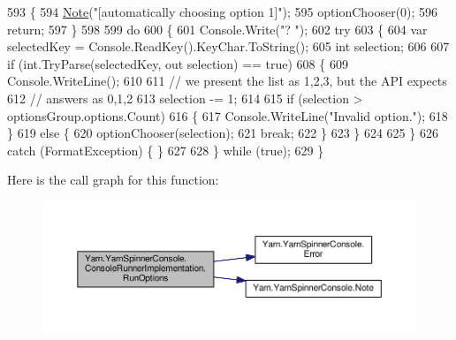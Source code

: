 \begin{DoxyCode}
593                 \{
594                     \hyperlink{a00185_a939cc9e943c574b36c6af93e9c772702}{Note}(\textcolor{stringliteral}{"[automatically choosing option 1]"});
595                     optionChooser(0);
596                     \textcolor{keywordflow}{return};
597                 \}
598 
599                 \textcolor{keywordflow}{do}
600                 \{
601                     Console.Write(\textcolor{stringliteral}{"? "});
602                     \textcolor{keywordflow}{try}
603                     \{
604                         var selectedKey = Console.ReadKey().KeyChar.ToString();
605                         \textcolor{keywordtype}{int} selection;
606 
607                         \textcolor{keywordflow}{if} (\textcolor{keywordtype}{int}.TryParse(selectedKey, out selection) == \textcolor{keyword}{true})
608                         \{
609                             Console.WriteLine();
610 
611                             \textcolor{comment}{// we present the list as 1,2,3, but the API expects}
612                             \textcolor{comment}{// answers as 0,1,2}
613                             selection -= 1;
614 
615                             \textcolor{keywordflow}{if} (selection > optionsGroup.options.Count)
616                             \{
617                                 Console.WriteLine(\textcolor{stringliteral}{"Invalid option."});
618                             \}
619                             \textcolor{keywordflow}{else} \{
620                                 optionChooser(selection);
621                                 \textcolor{keywordflow}{break};
622                             \}
623                         \}
624 
625                     \}
626                     \textcolor{keywordflow}{catch} (FormatException) \{ \}
627 
628                 \} \textcolor{keywordflow}{while} (\textcolor{keyword}{true});
629             \}
\end{DoxyCode}


Here is the call graph for this function\-:
\nopagebreak
\begin{figure}[H]
\begin{center}
\leavevmode
\includegraphics[width=350pt]{a00046_a62674694fa65e5ae8c0c0da4fbceda51_cgraph}
\end{center}
\end{figure}


